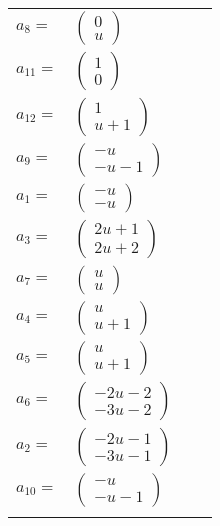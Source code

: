 \documentclass[1p]{elsarticle_modified}
\theoremstyle{definition}
\begin{document}
\begin{tabular}{m{7pt} m{180pt} m{7pt} m{180pt} }
\flushright $a_{8}=$&$\begin{pmatrix}0\\u\end{pmatrix}$ \\
\flushright $a_{11}=$&$\begin{pmatrix}1\\0\end{pmatrix}$ \\
\flushright $a_{12}=$&$\begin{pmatrix}1\\u+1\end{pmatrix}$ \\
\flushright $a_{9}=$&$\begin{pmatrix}- u\\- u-1\end{pmatrix}$ \\
\flushright $a_{1}=$&$\begin{pmatrix}- u\\- u\end{pmatrix}$ \\
\flushright $a_{3}=$&$\begin{pmatrix}2 u+1\\2 u+2\end{pmatrix}$ \\
\flushright $a_{7}=$&$\begin{pmatrix}u\\u\end{pmatrix}$ \\
\flushright $a_{4}=$&$\begin{pmatrix}u\\u+1\end{pmatrix}$ \\
\flushright $a_{5}=$&$\begin{pmatrix}u\\u+1\end{pmatrix}$ \\
\flushright $a_{6}=$&$\begin{pmatrix}-2 u-2\\-3 u-2\end{pmatrix}$ \\
\flushright $a_{2}=$&$\begin{pmatrix}-2 u-1\\-3 u-1\end{pmatrix}$ \\
\flushright $a_{10}=$&$\begin{pmatrix}- u\\- u-1\end{pmatrix}$\\&\end{tabular}
\end{document}
